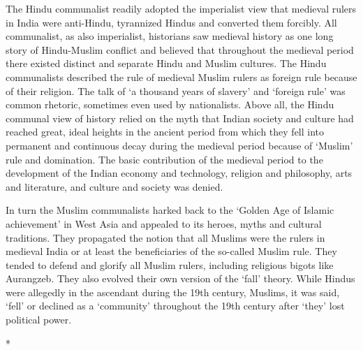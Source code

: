 \begin{multicols}{2}
The Hindu communalist readily adopted the imperialist view that medieval rulers in India were anti-Hindu, tyrannized Hindus and converted them forcibly. All communalist, as also imperialist, historians saw medieval history as one long story of Hindu-Muslim conflict and believed that throughout the medieval period there existed distinct and separate Hindu and Muslim cultures. The Hindu communalists described the rule of medieval Muslim rulers as foreign rule because of their religion. The talk of `a thousand years of slavery' and `foreign rule' was common rhetoric, sometimes even used by nationalists. Above all, the Hindu communal view of history relied on the myth that Indian society and culture had reached great, ideal heights in the ancient period from which they fell into permanent and continuous decay during the medieval period because of `Muslim' rule and domination. The basic contribution of the medieval period to the development of the Indian economy and technology, religion and philosophy, arts and literature, and culture and society was denied.

In turn the Muslim communalists harked back to the `Golden Age of Islamic achievement' in West Asia and appealed to its heroes, myths and cultural traditions. They propagated the notion that all Muslims were the rulers in medieval India or at least the beneficiaries of the so-called Muslim rule. They tended to defend and glorify all Muslim rulers, including religious bigots like Aurangzeb. They also evolved their own version of the `fall' theory. While Hindus were allegedly in the ascendant during the 19th century, Muslims, it was said, `fell' or declined as a `community' throughout the 19th century after `they' lost political power.

\begin{center}*\end{center}


\end{multicols}
